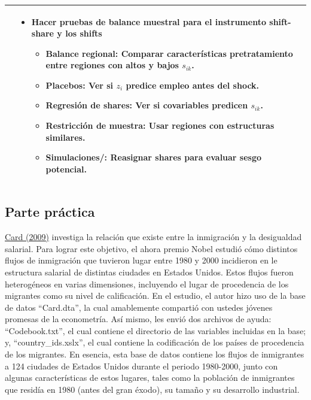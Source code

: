 \documentclass[a4paper, answers, addpoints, 11pt]{exam}
\begin{document}
\begin{enumerate}
\begin{table}[H]
\begin{tabular}{p{5cm} p{6cm} p{6cm}}
\begin{itemize}
\begin{itemize}
\end{itemize}
\end{itemize}


&  
\begin{itemize}
\item Hacer pruebas de balance muestral 
    para el instrumento shift-share y los shifts
    \begin{itemize}
    \item \textbf{Balance regional:} Comparar características pretratamiento entre regiones con altos y bajos \( s_{ik} \).
    \item \textbf{Placebos:} Ver si \( z_i \) predice empleo antes del shock.
    \item \textbf{Regresión de shares:} Ver si covariables predicen \( s_{ik} \).
    \item \textbf{Restricción de muestra:} Usar regiones con estructuras similares.
    \item \textbf{Simulaciones/:} Reasignar shares para evaluar sesgo potencial.
\end{itemize}
\end{itemize}
 \\
\hline
\end{tabular}
\end{table}


\end{enumerate}







\subsection*{Parte práctica}
\href{https://davidcard.berkeley.edu/papers/immigration-and-inequality.pdf}{Card (2009)} investiga la relación que existe entre la inmigración y la desigualdad salarial. Para lograr este objetivo, el ahora premio Nobel estudió cómo distintos flujos de inmigración que tuvieron lugar entre 1980 y 2000 incidieron en le estructura salarial de distintas ciudades en Estados Unidos. Estos flujos fueron heterogéneos en varias dimensiones, incluyendo el lugar de procedencia de los migrantes como su nivel de calificación. En el estudio, el autor hizo uso de la base de datos ``Card.dta'', la cual amablemente compartió con ustedes jóvenes promesas de la econometría. Así mismo, les envió dos archivos de ayuda: ``Codebook.txt'', el cual contiene el directorio de las variables incluidas en la base; y, ``country\_ids.xslx'', el cual contiene la codificación de los países de procedencia de los migrantes. En esencia, esta base de datos contiene los flujos de inmigrantes a 124 ciudades de Estados Unidos durante el periodo 1980-2000, junto con algunas características de estos lugares, tales como la población de inmigrantes que residía en 1980 (antes del gran éxodo), su tamaño y su desarrollo industrial. \\
\end{document}
